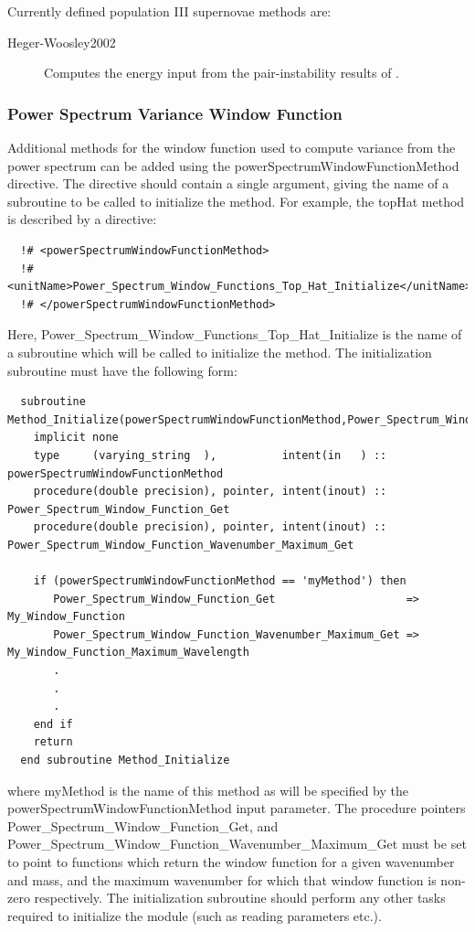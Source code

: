 Currently defined population III supernovae methods are:
\begin{description}
 \item [{\normalfont \ttfamily Heger-Woosley2002}] Computes the energy input from the pair-instability results of \cite{heger_nucleosynthetic_2002}.
\end{description}

\subsubsection{Power Spectrum Variance Window Function}\label{sec:PowerSpectrumWindowFunction}

Additional methods for the window function used to compute variance from the power spectrum can be added using the {\normalfont \ttfamily powerSpectrumWindowFunctionMethod} directive. The directive should contain a single argument, giving the name of a subroutine to be called to initialize the method. For example, the {\normalfont \ttfamily topHat} method is described by a directive:
\begin{verbatim}
  !# <powerSpectrumWindowFunctionMethod>
  !#  <unitName>Power_Spectrum_Window_Functions_Top_Hat_Initialize</unitName>
  !# </powerSpectrumWindowFunctionMethod>
\end{verbatim}
Here, {\normalfont \ttfamily Power\_Spectrum\_Window\_Functions\_Top\_Hat\_Initialize} is the name of a subroutine which will be called to initialize the method. The initialization subroutine must have the following form:
\begin{verbatim}
  subroutine Method_Initialize(powerSpectrumWindowFunctionMethod,Power_Spectrum_Window_Function_Get)
    implicit none
    type     (varying_string  ),          intent(in   ) :: powerSpectrumWindowFunctionMethod
    procedure(double precision), pointer, intent(inout) :: Power_Spectrum_Window_Function_Get
    procedure(double precision), pointer, intent(inout) :: Power_Spectrum_Window_Function_Wavenumber_Maximum_Get
    
    if (powerSpectrumWindowFunctionMethod == 'myMethod') then
       Power_Spectrum_Window_Function_Get                    => My_Window_Function
       Power_Spectrum_Window_Function_Wavenumber_Maximum_Get => My_Window_Function_Maximum_Wavelength
       .
       .
       .
    end if
    return
  end subroutine Method_Initialize
\end{verbatim}
where {\normalfont \ttfamily myMethod} is the name of this method as will be specified by the {\normalfont \ttfamily powerSpectrumWindowFunctionMethod} input parameter. The procedure pointers {\normalfont \ttfamily Power\_Spectrum\_Window\_Function\_Get}, and {\normalfont \ttfamily Power\_Spectrum\_Window\_Function\_Wavenumber\_Maximum\_Get} must be set to point to functions which return the window function for a given wavenumber and mass, and the maximum wavenumber for which that window function is non-zero respectively. The initialization subroutine should perform any other tasks required to initialize the module (such as reading parameters etc.).


